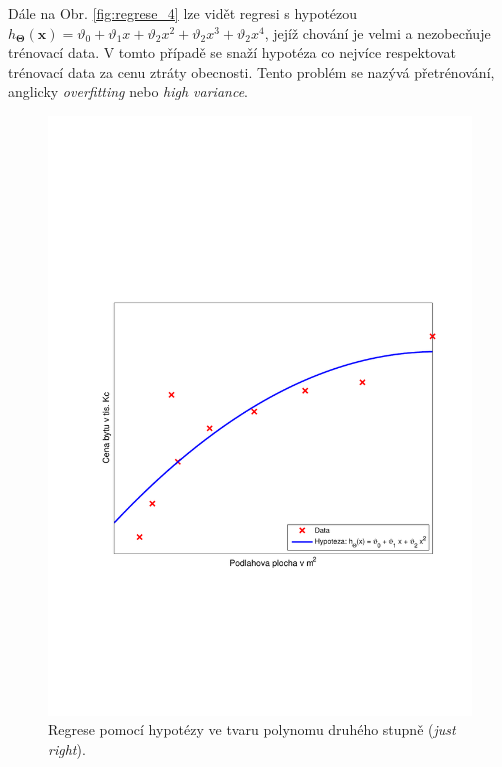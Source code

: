 \par{Dále na Obr. \ref{fig:regrese_4} lze vidět regresi s hypotézou $h_{\bm{\Theta}} \left( \bm{x} \right) = \vartheta_0 + \vartheta_1 x + \vartheta_2 x^2 + \vartheta_2 x^3 + \vartheta_2 x^4$, jejíž chování je velmi  a nezobecňuje trénovací data. V tomto případě se snaží hypotéza co nejvíce respektovat trénovací data za cenu ztráty obecnosti. Tento problém se nazývá přetrénování, anglicky \textit{overfitting} nebo \textit{high variance}.}

\begin{figure}[!ht]
	\centering
	\begin{minipage}[t]{0.48\textwidth}
		\includegraphics[width = \textwidth, trim = 2.5cm 7cm 2cm 9cm]{./Img/Regularizace/Pretrenovani1D/regrese_2.pdf}
  		\caption{Regrese pomocí hypotézy ve tvaru polynomu druhého stupně (\textit{just right}).}

\end{minipage}
\end{figure}
